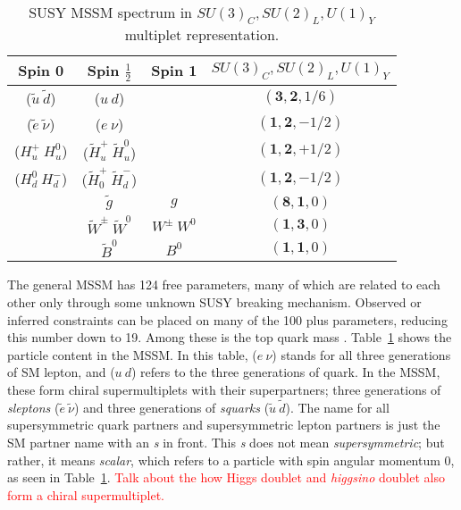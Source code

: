 \begin{table}[!htb]
\centering
\small
\begin{tabular}{|c|c|c|c|}
\hline
Spin 0  & Spin $\frac{1}{2}$& Spin 1 &  $SU(3)_{C}, SU(2)_{L}, U(1)_{Y}$ \\
\hline \hline
($\tilde{u}~\tilde{d}$) & ($u~d$)&   & $(\mathbf{3}, \mathbf{2}, 1/6)$ \\ 
\hline
($\tilde{e}~\tilde{\nu}$) & ($e~\nu$)&   & $(\mathbf{1}, \mathbf{2}, -1/2)$ \\
\hline
($H_u^+~H_u^0$)&($\tilde{H}_u^+~\tilde{H}_u^0$) && $(\mathbf{1}, \mathbf{2}, +1/2)$\\
($H_d^0~H_d^-$)&($\tilde{H}_0^+~\tilde{H}_d^-$) & &$(\mathbf{1}, \mathbf{2}, -1/2)$\\
\hline
 &$\tilde{g}$&  $g$ & $(\mathbf{8}, \mathbf{1}, 0)$ \\
\hline
& $\tilde{W}^\pm~ \tilde{W}^0$& $W^\pm~ W^0$ & $(\mathbf{1}, \mathbf{3}, 0)$  \\  
 & $\tilde{B}^0$& $B^0$ & $(\mathbf{1}, \mathbf{1}, 0)$\\ 
\hline

\hline %
\end{tabular}
\caption{SUSY MSSM spectrum in $SU(3)_{C}, SU(2)_{L}, U(1)_{Y}$ multiplet representation.}
\label{tab:susy}
\end{table}
The general MSSM has 124 free parameters, many of which are related to each other only through some unknown SUSY breaking mechanism.  Observed or inferred constraints can be placed on many of the 100 plus parameters, reducing this number down to 19.  Among these is the top quark mass \cite{Bechtle2006}.  Table~\ref{tab:susy} shows the particle content in the MSSM.  In this table,  ($e~\nu$) stands for all three generations of SM lepton, and ($u~d$) refers to the three generations of quark.  In the MSSM, these form chiral supermultiplets with their superpartners; three generations of \textit{sleptons} ($\tilde{e}~\tilde{\nu}$) and three generations of \textit{squarks} ($\tilde{u}~\tilde{d}$).  The name for all supersymmetric quark partners and supersymmetric lepton partners is just the SM partner name with an \textit{s} in front.  This \textit{s} does not mean \textit{supersymmetric}; but rather, it means \textit{scalar}, which refers to a particle with spin angular momentum 0, as seen in Table~\ref{tab:susy}.   \textcolor{red}{Talk about the how Higgs doublet and \textit{higgsino} doublet also form a chiral supermultiplet.}

